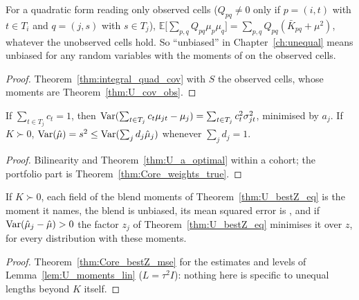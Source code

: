 \begin{theorem}\label{thm:U_integral_quad}
  \leanok
  For a quadratic form reading only observed cells ($Q_{pq} \ne 0$ only if
  $p = (i,t)$ with $t \in T_i$ and $q = (j,s)$ with $s \in T_j$),
  $\mathbb E\bigl[\sum_{p,q} Q_{pq}\mu_p\mu_q\bigr] = \sum_{p,q} Q_{pq}(\bar K_{pq} + \mu^2)$,
  whatever the unobserved cells hold. So ``unbiased'' in
  Chapter~\ref{ch:unequal} means unbiased for any random variables with the
  moments of  on the observed cells.
\end{theorem}
\begin{proof}
  \leanok
  Theorem~\ref{thm:integral_quad_cov} with $S$ the observed cells, whose
  moments are Theorem~\ref{thm:U_cov_obs}.
\end{proof}

\begin{theorem}\label{thm:U_weights_true}
  \leanok
  If $\sum_{t\in T_j} c_t = 1$, then
  $\operatorname{Var}(\sum_{t\in T_j} c_t\mu_{jt} - \mu_j) = \sum_{t\in T_j} c_t^2\sigma_{jt}^2$,
  minimised by $a_j$. If $K \succ 0$,
  $\operatorname{Var}(\hat\mu) = s^2 \le \operatorname{Var}(\sum_j d_j\hat\mu_j)$ whenever $\sum_j d_j = 1$.
\end{theorem}
\begin{proof}
  \leanok
  Bilinearity and Theorem~\ref{thm:U_a_optimal} within a cohort; the
  portfolio part is Theorem~\ref{thm:Core_weights_true}.
\end{proof}

\begin{theorem}\label{thm:U_bestZ_mse}
  \leanok
  If $K \succ 0$, each field of the blend moments of
  Theorem~\ref{thm:U_bestZ_eq} is the moment it names, the blend is unbiased,
  its mean squared error is , and if $\operatorname{Var}(\hat\mu_j - \hat\mu) > 0$ the
  factor $z_j$ of Theorem~\ref{thm:U_bestZ_eq} minimises it over $z$, for
  every distribution with these moments.
\end{theorem}
\begin{proof}
  \leanok
  Theorem~\ref{thm:Core_bestZ_mse} for the estimates and levels of
  Lemma~\ref{lem:U_moments_lin} ($L = \tau^2 I$): nothing here is specific to
  unequal lengths beyond $K$ itself.
\end{proof}

